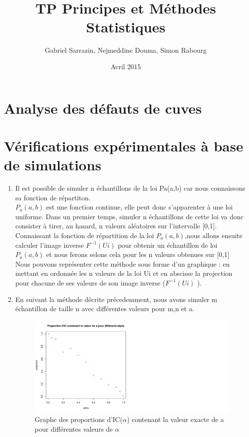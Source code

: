 \documentclass[12pt]{article}
\title{TP Principes et M\'{e}thodes Statistiques}
\author{Gabriel Sarrazin, Nejmeddine Douma, Simon Rabourg}
\date{Avril 2015}
\begin{document}

\maketitle

\section{Analyse des d\'{e}fauts de cuves}


\section{V\'{e}rifications exp\'{e}rimentales \`{a} base de simulations}


\begin{enumerate}
\item Il est possible de simuler n \'{e}chantillons de la loi Pa(a,b) car nous connaissons sa fonction de r\'{e}partiton. 
\\
$P_a(a,b)$ est une fonction continue, elle peut donc s'apparenter \`{a} une loi uniforme.  Dans un premier temps, simuler n \'{e}chantillons de cette loi va donc consister  \`{a} tirer, au hasard, n valeurs al\'{e}atoires sur l'intervalle [0,1]. Connaissant la fonction de r\'{e}partition de la loi  $P_a(a,b)$,nous allons ensuite calculer l'image inverse $ F^{-1}(Ui)$ pour obtenir un \'{e}chantillon de loi $P_a(a,b)$ et nous ferons selons cela pour les n valeurs obtenues sur [0,1]
\\
Nous pouvons repr\'{e}senter cette m\'{e}thode sous forme d'un graphique : en mettant en ordonn\'{e}e les n valeurs de la loi Ui et en abscisse la projection pour chacune de ses valeurs de son image inverse ($F^{-1}(Ui)$ ).
\\

\item
 En suivant la m\'{e}thode d\'{e}crite pr\'{e}cedemment, nous  avons simuler m \'{e}chantillon de taille n avec diff\'{e}rentes valeurs pour m,n et a. 

\begin{figure}[ht]
\label{graph1}
\centering
\includegraphics[width=1.0\textwidth]{figures/Graph_P2Q2.pdf}
\caption{Graphe des proportions d'IC($\alpha$) contenant la valeur exacte de a pour diff\'{e}rentes valeurs de $\alpha$}
\end{figure}


\end{enumerate}
\end{document}
